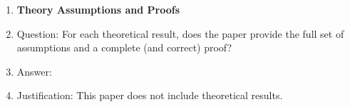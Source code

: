 \begin{enumerate}
\item {\bf Theory Assumptions and Proofs}
    \item[] Question: For each theoretical result, does the paper provide the full set of assumptions and a complete (and correct) proof?
    \item[] Answer: \answerNA{} %
    \item[] Justification: This paper does not include theoretical results.


\end{enumerate}
